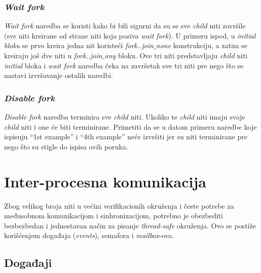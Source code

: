 \subsubsection{\emph{Wait fork}}

\emph{Wait fork} naredba se koristi kako bi bili sigurni da su se sve
\emph{child} niti završile (sve niti kreirane od strane niti koja poziva
\emph{wait fork}). U primeru ispod, u \emph{initial bloku} se prvo kreira jedna
nit koristeći \emph{fork..join\(\_\)none} konstrukciju, a zatim se kreiraju još
dve niti u \emph{fork..join\(\_\)any} bloku. Ove tri niti predstavljaju
\emph{child} niti \emph{initial} bloka i \emph{wait fork} naredba čeka na
završetak sve tri niti pre nego što se nastavi izvršavanje ostalih naredbi.



\subsubsection{\emph{Disable fork}}

\emph{Disable fork} naredba terminira sve \emph{child} niti. Ukoliko te
\emph{child} niti imaju svoje \emph{child} niti i one će biti terminirane.
Primetiti da se u datom primeru naredbe koje ispisuju ``1st example'' i ``4th
example'' neće izvršiti jer su niti terminirane pre nego što su stigle do ispisa
ovih poruka.




\section{Inter-procesna komunikacija}

Zbog velikog broja niti u većini verifikacionih okruženja i česte potrebe za
međusobnom komunikacijom i sinhronizacijom, potrebno je obezbediti bezbezbedan
i jednostavan način za pisanje \emph{thread-safe} okruženja. Ovo se postiže
korišćenjem događaja (\emph{events}), semafora i \emph{mailbox}-ova.


\subsection{Događaji}

